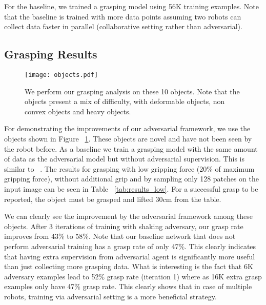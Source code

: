 \documentclass[letterpaper, 10 pt, conference]{ieeeconf}  %
\begin{document}
For the baseline, we trained a grasping model using 56K training examples. Note that the baseline is trained with more data points assuming two robots can collect data faster in parallel (collaborative setting rather than adversarial).

\subsection{Grasping Results}\begin{figure}[t!]
\begin{center}
\texttt{[image: objects.pdf]}
\end{center}
\caption{We perform our grasping analysis on these 10 objects. Note that the objects present a mix of difficulty, with deformable objects, non convex objects and heavy objects.}
\label{fig:objects}
\end{figure}

For demonstrating the improvements of our adversarial framework, we use the objects shown in Figure ~\ref{fig:objects}. These objects are novel and have not been seen by the robot before. As a baseline we train a grasping model with the same amount of data as the adversarial model but without adversarial supervision. This is similar to ~\cite{pinto2016supersizing}.
The results for grasping with low gripping force (20\% of maximum gripping force), without additional grip and by sampling only 128 patches on the input image can be seen in Table ~\ref{tab:results_low}. For a successful grasp to be reported, the object must be grasped and lifted 30cm from the table. 

We can clearly see the improvement by the adversarial framework among these objects. After 3 iterations of training with shaking adversary, our grasp rate improves from 43\% to 58\%. Note that our baseline network that does not perform adversarial training has a grasp rate of only 47\%. This clearly indicates that having extra supervision from adversarial agent is significantly more useful than just collecting more grasping data. What is interesting is the fact that 6K adversary examples lead to 52\% grasp rate (iteration 1) where as 16K extra grasp examples only have 47\% grasp rate. This clearly shows that in case of multiple robots, training via adversarial setting is a more beneficial strategy.
\end{document}
